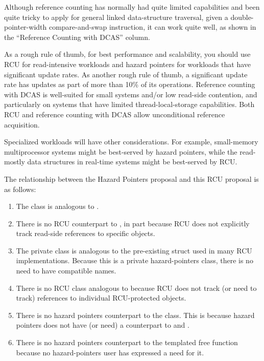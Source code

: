\documentclass[letterpaper,10pt]{article}
\begin{document}
Although reference counting has normally had quite limited capabilities
and been quite tricky to apply for general linked data-structure
traversal, given a double-pointer-width compare-and-swap instruction,
it can work quite well, as shown in the ``Reference Counting with DCAS''
column.

As a rough rule of thumb, for best performance and scalability, you
should use RCU for read-intensive workloads and hazard pointers for
workloads that have significant update rates.
As another rough rule of thumb, a significant update rate has updates
as part of more than 10\% of its operations.
Reference counting with DCAS is well-suited for small systems and/or
low read-side contention, and particularly on systems that have limited
thread-local-storage capabilities.
Both RCU and reference counting with DCAS allow unconditional reference
acquisition.

Specialized workloads will have other considerations.
For example, small-memory multiprocessor systems might be best-served by
hazard pointers, while the read-mostly data structures in real-time
systems might be best-served by RCU.

The relationship between the Hazard Pointers proposal and this RCU
proposal is as follows:

\begin{enumerate}
\item	The  class is analogous to .
\item	There is no RCU counterpart to , in part because
	RCU does not explicitly track read-side references to specific
	objects.
\item	The private  class is analogous to the pre-existing
	 struct used in many RCU implementations.
	Because this is a private hazard-pointers class, there is no
	need to have compatible names.
\item	There is no RCU class analogous to  because
	RCU does not track (or need to track) references to individual
	RCU-protected objects.
\item	There is no hazard pointers counterpart to the 
	class.
	This is because hazard pointers does not have (or need)
	a counterpart to  and .
\item	There is no hazard pointers counterpart to the 
	templated free function because no hazard-pointers user has
	expressed a need for it.
\end{enumerate}
\end{document}
